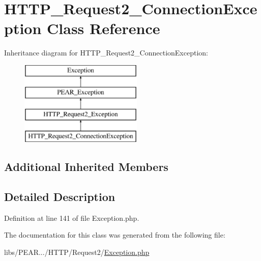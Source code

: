 \hypertarget{classHTTP__Request2__ConnectionException}{}\section{H\+T\+T\+P\+\_\+\+Request2\+\_\+\+Connection\+Exception Class Reference}
\label{classHTTP__Request2__ConnectionException}
Inheritance diagram for H\+T\+T\+P\+\_\+\+Request2\+\_\+\+Connection\+Exception\+:\begin{figure}[H]
\begin{center}
\leavevmode
\includegraphics[height=4.000000cm]{classHTTP__Request2__ConnectionException}
\end{center}
\end{figure}
\subsection*{Additional Inherited Members}


\subsection{Detailed Description}


Definition at line 141 of file Exception.\+php.



The documentation for this class was generated from the following file\+:\begin{DoxyCompactItemize}
\item 
libs/\+P\+E\+A\+R.../\+H\+T\+T\+P/\+Request2/\hyperlink{HTTP_2Request2_2Exception_8php}{Exception.\+php}\end{DoxyCompactItemize}
